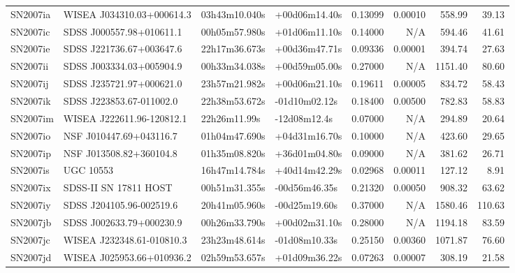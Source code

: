 \begin{longtable}{llllrrrr}
SN2007ia         &       WISEA J034310.03+000614.3 &   03h43m10.040s &   +00d06m14.40s &  0.13099 &  0.00010 &   558.99 &       39.13 \\
SN2007ic         &        SDSS J000557.98+010611.1 &   00h05m57.980s &   +01d06m11.10s &  0.14000 &      N/A &   594.46 &       41.61 \\
SN2007ie         &        SDSS J221736.67+003647.6 &   22h17m36.673s &   +00d36m47.71s &  0.09336 &  0.00001 &   394.74 &       27.63 \\
SN2007ii         &        SDSS J003334.03+005904.9 &   00h33m34.038s &   +00d59m05.00s &  0.27000 &      N/A &  1151.40 &       80.60 \\
SN2007ij         &        SDSS J235721.97+000621.0 &   23h57m21.982s &   +00d06m21.10s &  0.19611 &  0.00005 &   834.72 &       58.43 \\
SN2007ik         &        SDSS J223853.67-011002.0 &   22h38m53.672s &   -01d10m02.12s &  0.18400 &  0.00500 &   782.83 &       58.83 \\
SN2007im         &       WISEA J222611.96-120812.1 &    22h26m11.99s &    -12d08m12.4s &  0.07000 &      N/A &   294.89 &       20.64 \\
SN2007io         &         NSF J010447.69+043116.7 &   01h04m47.690s &   +04d31m16.70s &  0.10000 &      N/A &   423.60 &       29.65 \\
SN2007ip         &         NSF J013508.82+360104.8 &   01h35m08.820s &   +36d01m04.80s &  0.09000 &      N/A &   381.62 &       26.71 \\
SN2007is         &                       UGC 10553 &   16h47m14.784s &   +40d14m42.29s &  0.02968 &  0.00011 &   127.12 &        8.91 \\
SN2007ix         &           SDSS-II SN 17811 HOST &   00h51m31.355s &   -00d56m46.35s &  0.21320 &  0.00050 &   908.32 &       63.62 \\
SN2007iy         &        SDSS J204105.96-002519.6 &   20h41m05.960s &   -00d25m19.60s &  0.37000 &      N/A &  1580.46 &      110.63 \\
SN2007jb         &        SDSS J002633.79+000230.9 &   00h26m33.790s &   +00d02m31.10s &  0.28000 &      N/A &  1194.18 &       83.59 \\
SN2007jc         &       WISEA J232348.61-010810.3 &   23h23m48.614s &   -01d08m10.33s &  0.25150 &  0.00360 &  1071.87 &       76.60 \\
SN2007jd         &       WISEA J025953.66+010936.2 &   02h59m53.657s &   +01d09m36.22s &  0.07263 &  0.00007 &   308.19 &       21.58 \\

\end{longtable}
